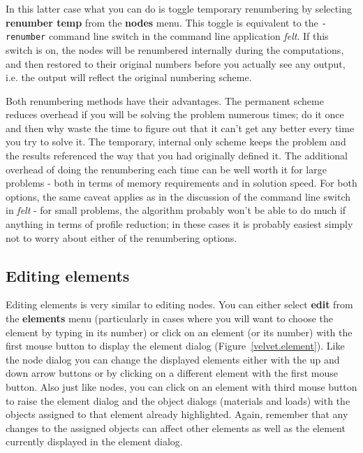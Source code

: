 In this latter case what you can do is toggle temporary renumbering by 
selecting {\bf renumber temp} from the {\bf nodes} menu.
This toggle is equivalent to the {\tt -renumber}
command line switch in the command line application {\em felt}.  If this
switch is on, the nodes will be renumbered internally during the computations,
and then restored to their original numbers before you actually see any
output, i.e. the output will reflect the original numbering scheme.  

Both renumbering methods have their advantages.  The permanent scheme reduces
overhead if you will be solving the problem numerous times; do it once
and then why waste the time to figure out that it can't get any better
every time you try to solve it.  The temporary, internal only scheme keeps
the problem and the results referenced the way that you had originally
defined it.  The additional overhead of doing the renumbering each time
can be well worth it for large problems - both in terms of memory
requirements and in solution speed.  For both options, the same caveat applies 
as in the discussion of the command line switch in {\em felt} - 
for small problems, the algorithm probably won't be able to do much
if anything in terms of profile reduction; in these cases it is probably
easiest simply not to worry about either of the renumbering options.

\subsection{Editing elements}

Editing elements is very similar to editing nodes.  You can either select
{\bf edit} from the {\bf elements} menu (particularly in cases where you
will want to choose the element by typing in its number) or click on 
an element (or its number) with the first mouse button to display the element 
dialog (Figure~\ref{velvet.element}).   
Like the node dialog you can change the displayed
elements either with the up and down arrow buttons or by clicking on
a different element with the first mouse button.  Also just like nodes,
you can click on an element with third mouse button to raise the element
dialog and the object dialogs (materials and loads) with the objects assigned
to that element already highlighted.  Again, remember that any changes to
the assigned objects can affect other elements as well as the element
currently displayed in the element dialog.


